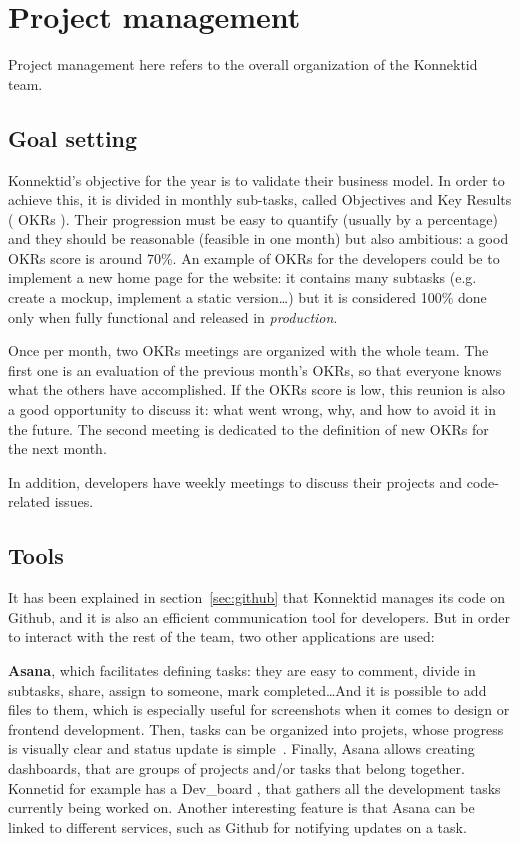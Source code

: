 \section{Project management}
\label{sec:management}

Project management here refers to the overall organization of the Konnektid team.

\subsection{Goal setting}
\label{ssec:goalSetting}

Konnektid's objective for the year is to validate their business model. In order to achieve this, it is divided in monthly sub-tasks, called Objectives and Key Results (\guillemotleft{} OKRs \guillemotright{}). Their progression must be easy to quantify (usually by a percentage) and they should be reasonable (feasible in one month) but also ambitious: a good OKRs score is around 70\%. An example of OKRs for the developers could be to implement a new home page for the website: it contains many subtasks (e.g. create a mockup, implement a static version\ldots) but it is considered 100\% done only when fully functional and released in \textit{production}.

Once per month, two OKRs meetings are organized with the whole team. The first one is an evaluation of the previous month's OKRs, so that everyone knows what the others have accomplished. If the OKRs score is low, this reunion is also a good opportunity to discuss it: what went wrong, why, and how to avoid it in the future. The second meeting is dedicated to the definition of new OKRs for the next month.

In addition, developers have weekly meetings to discuss their projects and code-related issues.

\subsection{Tools}
\label{ssec:tools}

It has been explained in {\sc section}~\ref{sec:github} that Konnektid manages its code on Github, and it is also an efficient communication tool for developers. But in order to interact with the rest of the team, two other applications are used:

\textbf{Asana}, which facilitates defining tasks: they are easy to comment, divide in subtasks, share, assign to someone, mark completed\ldots And it is possible to add files to them, which is especially useful for screenshots when it comes to design or frontend development. Then, tasks can be organized into projets, whose progress is visually clear and status update is simple~\cite{asana}. Finally, Asana allows creating dashboards, that are groups of projects and/or tasks that belong together. Konnetid for example has a \guillemotleft{} Dev\_board \guillemotright{}, that gathers all the development tasks currently being worked on. Another interesting feature is that Asana can be linked to different services, such as Github for notifying updates on a task.

